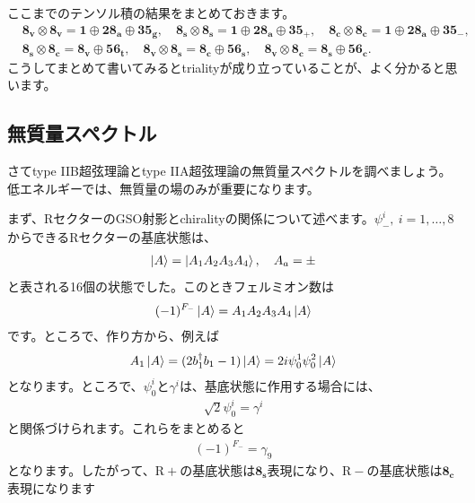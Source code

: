 \documentclass[report,paper=a4, fontsize=12pt, line_length=16cm, number_of_lines=34,dvipdfmx]{jlreq}
\numberwithin{equation}{chapter}
\numberwithin{equation}{section}
\newcommand{\Rp}{\mathrm{R}+}
\newcommand{\Rm}{\mathrm{R}-}
\newcommand{\triv}{\mathbf{1}}
\newcommand{\etv}{\mathbf{8_v}}
\newcommand{\ets}{\mathbf{8_s}}
\newcommand{\etc}{\mathbf{8_c}}
\newcommand{\tweta}{\mathbf{28_{a}}}
\newcommand{\thfvg}{\mathbf{35_{g}}}
\newcommand{\thfvp}{\mathbf{35}_{+}}
\newcommand{\thfvm}{\mathbf{35}_{-}}
\newcommand{\fsxt}{\mathbf{56_t}}
\newcommand{\fsxs}{\mathbf{56_s}}
\newcommand{\fsxc}{\mathbf{56_c}}
\begin{document}
ここまでのテンソル積の結果をまとめておきます。
\begin{align}
  &\etv\otimes\etv=\triv \oplus \tweta\oplus \thfvg,\quad
  \ets\otimes\ets=\triv \oplus \tweta\oplus \thfvp,\quad
  \etc\otimes\etc=\triv \oplus \tweta\oplus \thfvm,\nonumber\\
  &\ets\otimes \etc=\etv\oplus\fsxt,\quad
  \etv\otimes \ets=\etc\oplus\fsxs,\quad
  \etv\otimes \etc=\ets\oplus\fsxc.
\end{align}
こうしてまとめて書いてみるとtrialityが成り立っていることが、よく分かると思います。

\subsection{無質量スペクトル}
さてtype IIB超弦理論とtype IIA超弦理論の無質量スペクトルを調べましょう。低エネルギーでは、無質量の場のみが重要になります。

まず、RセクターのGSO射影とchiralityの関係について述べます。$\psi^{i}_{-},\ i=1,\dots,8$からできるRセクターの基底状態は、
\begin{align}
  \ket{A}=\ket{A_1A_2A_3A_4},\quad
  A_a=\pm
\end{align}
と表される16個の状態でした。このときフェルミオン数は
\begin{align}
  (-1)^{F_-}\ket{A}=A_1A_2A_3A_4\ket{A}
\end{align}
です。ところで、作り方から、例えば
\begin{align}
  A_1\ket{A}=(2b_1^\dag b_1-1)\ket{A}=2i\psi^{1}_{0}\psi^{2}_{0}\ket{A}
\end{align}
となります。ところで、$\psi_0^{i}$と$\gamma^{i}$は、基底状態に作用する場合には、
\begin{align}
  \sqrt{2}\psi_{0}^{i}=\gamma^{i}
\end{align}
と関係づけられます。これらをまとめると
\begin{align}
  (-1)^{F_-}=\gamma_9
\end{align}
となります。したがって、$\Rp$の基底状態は$\ets$表現になり、$\Rm$の基底状態は$\etc$表現になります
\end{document}
